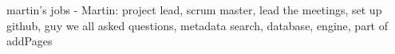 martin's jobs
- Martin: project lead, scrum master, lead the meetings, set up github, guy we all asked questions, metadata search, database, engine, part of addPages
